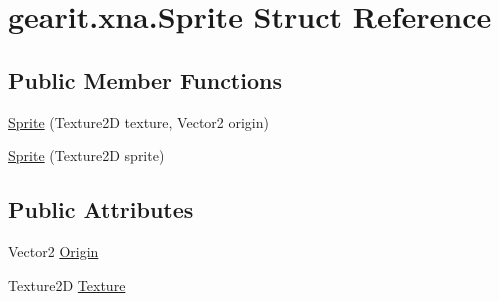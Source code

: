 \hypertarget{structgearit_1_1xna_1_1_sprite}{\section{gearit.\+xna.\+Sprite Struct Reference}
\label{structgearit_1_1xna_1_1_sprite}
}
\subsection*{Public Member Functions}
\begin{DoxyCompactItemize}
\item 
\hyperlink{structgearit_1_1xna_1_1_sprite_a441591cac41fc512c0f3c3d08023ddce}{Sprite} (Texture2\+D texture, Vector2 origin)
\item 
\hyperlink{structgearit_1_1xna_1_1_sprite_a67456f16965c91effaea4fc7c6b7e546}{Sprite} (Texture2\+D sprite)
\end{DoxyCompactItemize}
\subsection*{Public Attributes}
\begin{DoxyCompactItemize}
\item 
Vector2 \hyperlink{structgearit_1_1xna_1_1_sprite_a0a500f2a3f3c69e1e6424695485c8a26}{Origin}
\item 
Texture2\+D \hyperlink{structgearit_1_1xna_1_1_sprite_a4f3052d46120459d8fccb48b31092aee}{Texture}
\end{DoxyCompactItemize}



